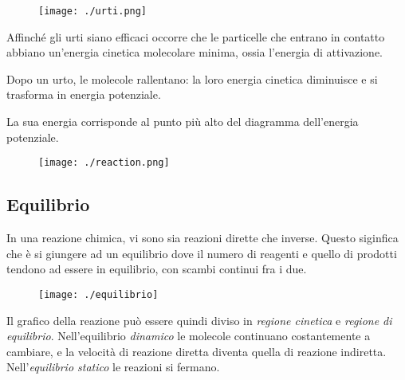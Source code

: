 \documentclass[a4paper]{article}
\begin{document}
\begin{center}
\begin{figure}[th]
    \centering
    \texttt{[image: ./urti.png]}
\end{figure}
\end{center}

Affinché gli urti siano efficaci occorre che le particelle che
entrano in contatto abbiano un'energia cinetica molecolare
minima, ossia l'energia di attivazione.

Dopo un urto, le molecole rallentano: la loro energia
cinetica diminuisce e si trasforma in energia potenziale.

\pagebreak


La sua energia corrisponde al punto più alto del diagramma dell'energia potenziale.

\begin{center}
\begin{figure}[th]
    \centering
    \texttt{[image: ./reaction.png]}
\end{figure}
\end{center}

\pagebreak

\subsection{Equilibrio}

In una reazione chimica, vi sono sia reazioni dirette che inverse.
Questo siginfica che è si giungere ad un equilibrio dove
il numero di reagenti e quello di prodotti tendono ad essere in equilibrio,
con scambi continui fra i due.

\begin{center}
\begin{figure}[th]
    \centering
    \texttt{[image: ./equilibrio]}
\end{figure}
\end{center}

Il grafico della reazione può essere quindi diviso in \textit{regione cinetica}
e \textit{regione di equilibrio}. 
Nell'equilibrio \textit{dinamico} le molecole continuano costantemente a
cambiare, e la velocità di reazione diretta diventa quella di reazione indiretta.
Nell'\textit{equilibrio statico} le reazioni si fermano.
\end{document}
